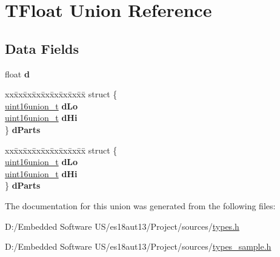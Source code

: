 \hypertarget{union_t_float}{}\section{T\+Float Union Reference}
\label{union_t_float}
\subsection*{Data Fields}
\begin{DoxyCompactItemize}
\item 
\hypertarget{union_t_float_a5261069e995f7e1b2b3b7580c954996b}{}float {\bfseries d}\label{union_t_float_a5261069e995f7e1b2b3b7580c954996b}

\item 
\hypertarget{union_t_float_a6af8261b5f02797cbcfaba49f66ad824}{}\begin{tabbing}
xx\=xx\=xx\=xx\=xx\=xx\=xx\=xx\=xx\=\kill
struct \{\\
\>\hyperlink{unionuint16union__t}{uint16union\_t} {\bfseries dLo}\\
\>\hyperlink{unionuint16union__t}{uint16union\_t} {\bfseries dHi}\\
\} {\bfseries dParts}\label{union_t_float_a6af8261b5f02797cbcfaba49f66ad824}
\\

\end{tabbing}\item 
\hypertarget{union_t_float_ae7e0e48c765e1a39d1acacd1154b3315}{}\begin{tabbing}
xx\=xx\=xx\=xx\=xx\=xx\=xx\=xx\=xx\=\kill
struct \{\\
\>\hyperlink{unionuint16union__t}{uint16union\_t} {\bfseries dLo}\\
\>\hyperlink{unionuint16union__t}{uint16union\_t} {\bfseries dHi}\\
\} {\bfseries dParts}\label{union_t_float_ae7e0e48c765e1a39d1acacd1154b3315}
\\

\end{tabbing}\end{DoxyCompactItemize}


The documentation for this union was generated from the following files\+:\begin{DoxyCompactItemize}
\item 
D\+:/\+Embedded Software U\+S/es18aut13/\+Project/sources/\hyperlink{types_8h}{types.\+h}\item 
D\+:/\+Embedded Software U\+S/es18aut13/\+Project/sources/\hyperlink{types__sample_8h}{types\+\_\+sample.\+h}\end{DoxyCompactItemize}
